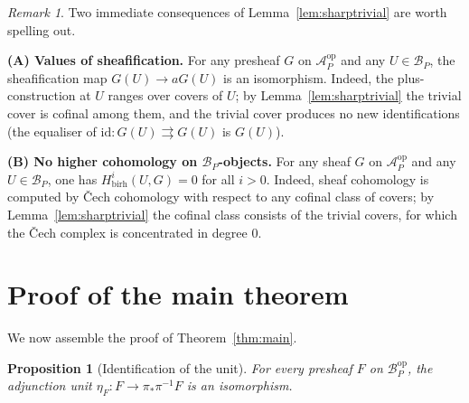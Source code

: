 \documentclass[11pt]{article}
\newtheorem{proposition}[theorem]{Proposition}
\theoremstyle{definition}
\theoremstyle{remark}
\newtheorem{remark}[theorem]{Remark}
\newcommand{\Acal}{\mathcal{A}}
\newcommand{\Bcal}{\mathcal{B}}
\newcommand{\op}{\mathrm{op}}
\begin{document}
\begin{remark}\label{rmk:consequences}
Two immediate consequences of Lemma~\ref{lem:sharptrivial} are worth spelling
out.

\smallskip
\noindent\textbf{(A) Values of sheafification.}  For any presheaf $G$ on
$\Acal_P^{\op}$ and any $U \in \Bcal_P$, the sheafification map
$G(U) \to aG(U)$ is an isomorphism.  Indeed, the plus-construction at $U$
ranges over covers of $U$; by Lemma~\ref{lem:sharptrivial} the trivial cover
is cofinal among them, and the trivial cover produces no new identifications
(the equaliser of $\mathrm{id}: G(U) \rightrightarrows G(U)$ is $G(U)$).

\smallskip
\noindent\textbf{(B) No higher cohomology on $\Bcal_P$-objects.}  For any
sheaf $G$ on $\Acal_P^{\op}$ and any $U \in \Bcal_P$, one has
$H^i_{\mathrm{birh}}(U, G) = 0$ for all $i > 0$.  Indeed, sheaf cohomology is
computed by \v{C}ech cohomology with respect to any cofinal class of covers;
by Lemma~\ref{lem:sharptrivial} the cofinal class consists of the trivial
covers, for which the \v{C}ech complex is concentrated in degree $0$.
\end{remark}

\section{Proof of the main theorem}\label{sec:proof}

We now assemble the proof of Theorem~\ref{thm:main}.

\begin{proposition}[Identification of the unit]\label{prop:unit}
For every presheaf $F$ on $\Bcal_P^{\op}$, the adjunction unit
$\eta_F : F \to \pi_* \pi^{-1} F$ is an isomorphism.
\end{proposition}
\end{document}
